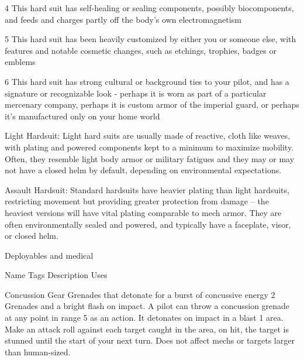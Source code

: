   4      This hard suit has self-healing or sealing components, possibly biocomponents, and feeds and charges  
         partly off the body’s own electromagnetism 

  5      This hard suit has been heavily customized by either you or someone else, with features and notable  
         cosmetic changes, such as etchings, trophies, badges or emblems 

  6      This hard suit has strong cultural or background ties to your pilot, and has a signature or recognizable look -  
         perhaps it is worn as part of a particular mercenary company, perhaps it is custom armor of the imperial  
         guard, or perhaps it’s manufactured only on your home world 

Light Hardsuit: Light hard suits are usually made of reactive, cloth like weaves, with plating and  
powered components kept to a minimum to maximize mobility. Often, they resemble light body  
armor or military fatigues and they may or may not have a closed helm by default, depending on  
environmental expectations. 
 

                                                                                                                           


Assault Hardsuit: Standard hardsuits have heavier plating than light hardsuits, restricting  
movement but providing greater protection from damage -- the heaviest versions will have vital  
plating comparable to mech armor. They are often environmentally sealed and powered, and  
typically have a faceplate, visor, or closed helm.
 

                                              Deployables and medical  

    Name                   Tags        Description                                                            Uses 

    Concussion             Gear        Grenades that detonate for a burst of concussive energy               2 
    Grenades                           and a bright flash on impact. A pilot can throw a  
                                       concussion grenade at any point in range 5 as an action.  
                                       It detonates on impact in a blast 1 area. Make an attack  
                                       roll against each target caught in the area, on hit, the  
                                       target is stunned until the start of your next turn. Does not  
                                       affect mechs or targets larger than human-sized. 

